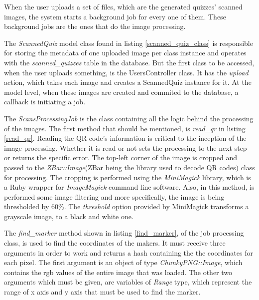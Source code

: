 When the user uploads a set of files, which are the generated quizzes' scanned images, the system starts a background job for every one of them. These background jobs are the ones that do the image processing. 

The \textit{ScannedQuiz} model class found in listing \ref{scanned_quiz_class} is responsible for storing the metadata of one uploaded image per class instance and operates with the \textit{scanned\_quizzes} table in the database. But the first class to be accessed, when the user uploads something, is the UsersController class. It has the \textit{upload} action, which takes each image and creates a ScannedQuiz instance for it. At the model level, when these images are created and commited to the database, a callback is initiating a job. 



The \textit{ScansProcessingJob} is the class containing all the logic behind the processing of the images. The first method that should be mentioned, is \textit{read\_qr} in listing \ref{read_qr}. Reading the QR code's information is critical to the inception of the image processing. Whether it is read or not sets the processing to the next step or returns the specific error. The top-left corner of the image is cropped and passed to the \textit{ZBar::Image}(ZBar being the library used to decode QR codes) class for processing. The cropping is performed using the \textit{MiniMagick} library, which is a Ruby wrapper for \textit{ImageMagick} command line software. Also, in this method, is performed some image filtering and more specifically, the image is being thresholded by 60\%. The \textit{threshold} option provided by MiniMagick transforms a grayscale image, to a black and white one. 



The \textit{find\_marker} method shown in listing \ref{find_marker}, of the job processing class, is used to find the coordinates of the makers. It must receive three arguments in order to work and returns a hash containing the the coordinates for each pixel. The first argument is an object of type \textit{ChunkyPNG::Image}, which contains the rgb values of the entire image that was loaded. The other two arguments which must be given, are variables of \textit{Range} type, which represent the range of x axis and y axis that must be used to find the marker.  

